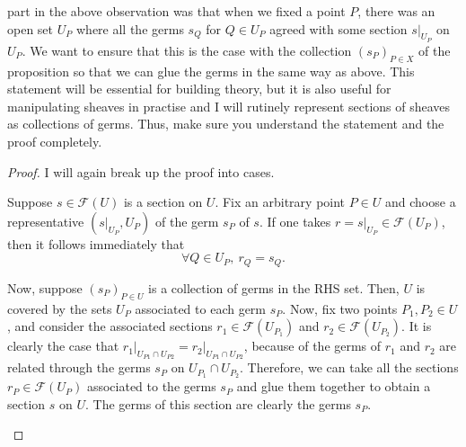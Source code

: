 part in the above observation was that when we fixed a point $P$, there was
an open set $U_{P}$ where all the germs $s_{Q}$ for $Q\in U_{P}$ agreed
with some section $s\vert_{U_{P}}$ on $U_{P}$. We want to ensure that this is
the case with the collection $(s_{P})_{P\in X}$ of the proposition so that we
can glue the germs in the same way as above. This statement will be essential
for building theory, but it is also useful for manipulating sheaves in
practise and I will rutinely represent sections of sheaves as collections
of germs. Thus, make sure you understand the statement and the proof
completely.
\begin{proof}
  I will again break up the proof into cases.

  \begin{description}[style=nextline]
    \item[$\subseteq\big)$]
          Suppose $s\in\mathscr{F}(U)$ is a section on $U$. Fix an arbitrary
          point $P\in U$ and choose a representative $(s\vert_{U_{P}}, U_{P})$
          of the germ $s_{P}$ of $s$. If one takes $r=s\vert_{U_{P}}\in
          \mathscr{F}(U_{P})$, then it follows immediately that
          \[\forall Q\in U_{P},\ r_{Q}=s_{Q}.\]
    \item[$\supseteq\big)$]
          Now, suppose $(s_{P})_{P\in U}$ is a collection of germs in the
          RHS set. Then, $U$ is covered by the sets $U_{P}$ associated to
          each germ $s_{P}$. Now, fix two points $P_{1},P_{2}\in U$,
          and consider the associated sections $r_{1}\in\mathscr{F}(U_{P_{1}})$
          and $r_{2}\in\mathscr{F}(U_{P_{2}})$. It is clearly the case that
          $r_{1}\vert_{U_{P1}\cap U_{P2}}=r_{2}\vert_{U_{P1}\cap U_{P2}}$, because
          of the germs of $r_{1}$ and $r_{2}$ are related through the germs
          $s_{P}$ on $U_{P_{1}}\cap U_{P_{2}}$. Therefore, we can take all
          the sections $r_{P}\in\mathscr{F}(U_{P})$ associated to the germs
          $s_{P}$ and glue them together to obtain a section $s$ on $U$.
          The germs of this section are clearly the germs $s_{P}$.
  \end{description}
\end{proof}

